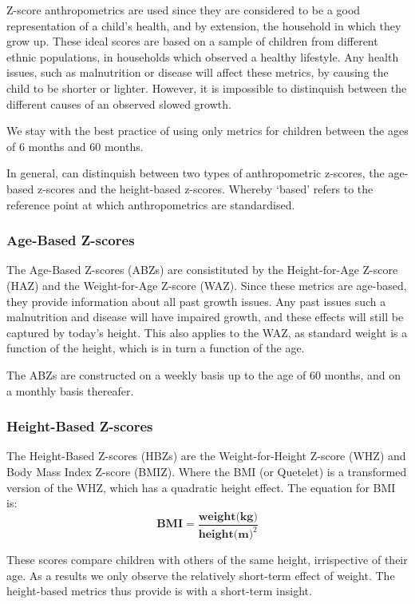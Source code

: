 \begin{refsection}
Z-score anthropometrics are used since they are considered to be a good representation of a child's health,
and by extension, the household in which they grow up.
These ideal scores are based on a sample of children from different ethnic populations,
in households which observed a healthy lifestyle.
Any health issues, such as malnutrition or disease will affect these metrics,
by causing the child to be shorter or lighter.
However, it is impossible to distinquish between the different causes of an observed slowed growth.

We stay with the best practice of using only metrics for children between the ages of 6 months and 60 months.

In general, can distinquish between two types of anthropometric z-scores, the age-based z-scores and the height-based z-scores.
Whereby `based' refers to the reference point at which anthropometrics are standardised.

\subsubsection{Age-Based Z-scores}
The Age-Based Z-scores (ABZs) are consistituted by the Height-for-Age Z-score (HAZ) and the Weight-for-Age Z-score (WAZ).
Since these metrics are age-based, they provide information about all past growth issues.
Any past issues such a malnutrition and disease will have impaired growth,
and these effects will still be captured by today's height.
This also applies to the WAZ, as standard weight is a function of the height,
which is in turn a function of the age.

The ABZs are constructed on a weekly basis up to the age of 60 months, and on a monthly basis thereafer.


\subsubsection{Height-Based Z-scores}
The Height-Based Z-scores (HBZs) are the Weight-for-Height Z-score (WHZ)
and Body Mass Index Z-score (BMIZ).
Where the BMI (or Quetelet) is a transformed version of the WHZ, which has a quadratic height effect.
The equation for BMI is:
\[
\textbf{BMI} = \frac{\textbf{weight(kg)}}{\textbf{height(m)}^2}
\]

These scores compare children with others of the same height, irrispective of their age.
As a results we only observe the relatively short-term effect of weight.
The height-based metrics thus provide is with a short-term insight.


\end{refsection}
